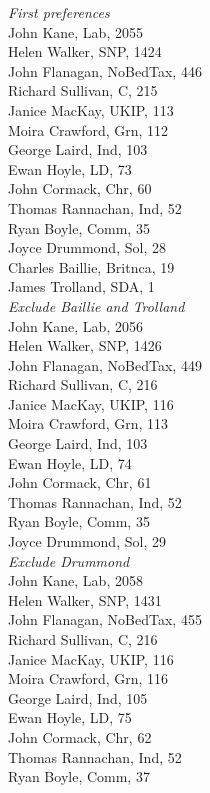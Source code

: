 \documentclass[a4paper,openany,10pt]{book}
\begin{document}
\emph{First preferences}\\
John Kane, Lab, 2055\\
Helen Walker, SNP, 1424\\
John Flanagan, NoBedTax, 446\\
Richard Sullivan, C, 215\\
Janice MacKay, UKIP, 113\\
Moira Crawford, Grn, 112\\
George Laird, Ind, 103\\
Ewan Hoyle, LD, 73\\
John Cormack, Chr, 60\\
{Thomas Rannachan}, Ind, 52\\
Ryan Boyle, Comm, 35\\
Joyce Drummond, Sol, 28\\
Charles Baillie, Britnca, 19\\
James Trolland, SDA, 1\\




\emph{Exclude Baillie and Trolland}\\
John Kane, Lab, 2056\\
Helen Walker, SNP, 1426\\
John Flanagan, NoBedTax, 449\\
Richard Sullivan, C, 216\\
Janice MacKay, UKIP, 116\\
Moira Crawford, Grn, 113\\
George Laird, Ind, 103\\
Ewan Hoyle, LD, 74\\
John Cormack, Chr, 61\\
{Thomas Rannachan}, Ind, 52\\
Ryan Boyle, Comm, 35\\
Joyce Drummond, Sol, 29\\




\emph{{Exclude Drummond}}\\
John Kane, Lab, 2058\\
Helen Walker, SNP, 1431\\
John Flanagan, NoBedTax, 455\\
Richard Sullivan, C, 216\\
Janice MacKay, UKIP, 116\\
Moira Crawford, Grn, 116\\
George Laird, Ind, 105\\
Ewan Hoyle, LD, 75\\
John Cormack, Chr, 62\\
{Thomas Rannachan}, Ind, 52\\
Ryan Boyle, Comm, 37\\
\end{document}
